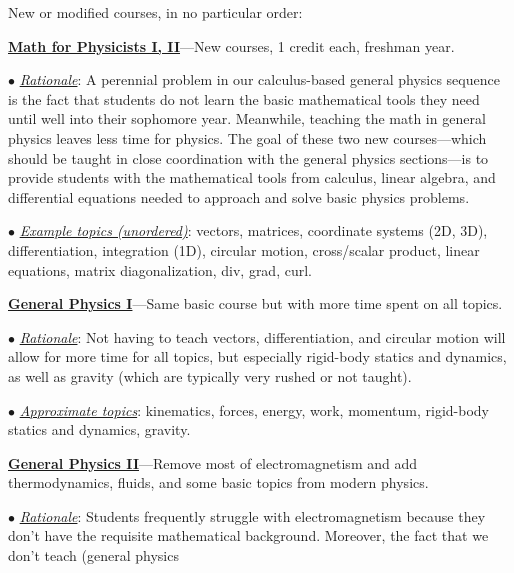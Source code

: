 \documentclass[12pt,preprint]{aastex}
\begin{document}
New or modified courses, in no particular order:
\begin{itemize*}
\item{\underline{\bf Math for Physicists I, II}---New courses, 1 credit each,
  freshman year. 
  \begin{itemize*}
    \item[$\bullet$]{\underline{\em Rationale}: A perennial problem in our
      calculus-based general physics sequence is the fact that students do not
      learn the basic mathematical tools they need until well into their
      sophomore year.  Meanwhile, teaching the math in general physics leaves
      less time for physics.  The goal of these two new courses---which should
      be taught in close coordination with the general physics sections---is to
      provide students with the mathematical tools from calculus, linear
      algebra, and differential equations needed to approach and solve basic
      physics problems.}
    \item[$\bullet$]{\underline{\em Example topics (unordered)}: vectors,
      matrices, coordinate systems (2D, 3D), differentiation, integration (1D),
      circular motion, cross/scalar product, linear equations, matrix
      diagonalization, div, grad, curl.}
  \end{itemize*}
}
\item{\underline{{\bf General Physics I}}---Same basic course but with more time
  spent on all topics.
  \begin{itemize*}
    \item[$\bullet$]{\underline{\em Rationale}: Not having to teach vectors,
      differentiation, and circular motion will allow for more time for all
      topics, but especially rigid-body statics and dynamics, as well as gravity
      (which are typically very rushed or not taught).}
    \item[$\bullet$]{\underline{\em Approximate topics}: kinematics, forces,
      energy, work, momentum, rigid-body statics and dynamics, gravity.}
  \end{itemize*}
}
\item{\underline{{\bf General Physics II}}---Remove most of electromagnetism and
  add thermodynamics, fluids, and some basic topics from modern physics.
  \begin{itemize*}
    \item[$\bullet$]{\underline{\em Rationale}: Students frequently struggle
      with electromagnetism because they don't have the requisite mathematical
      background.  Moreover, the fact that we don't teach (general physics
}
\end{itemize*}}
\end{itemize*}
\end{document}
